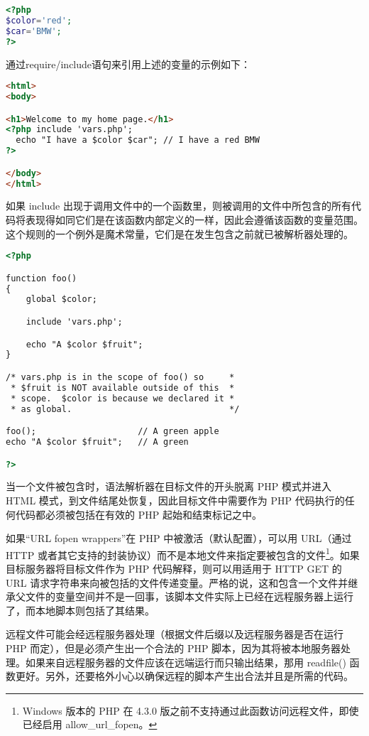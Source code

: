 \begin{lstlisting}[language=PHP]
<?php
$color='red';
$car='BMW';
?>
\end{lstlisting}


通过require/include语句来引用上述的变量的示例如下：


\begin{lstlisting}[language=HTML]
<html>
<body>

<h1>Welcome to my home page.</h1>
<?php include 'vars.php';
  echo "I have a $color $car"; // I have a red BMW
?>

</body>
</html>
\end{lstlisting}

如果 include 出现于调用文件中的一个函数里，则被调用的文件中所包含的所有代码将表现得如同它们是在该函数内部定义的一样，因此会遵循该函数的变量范围。这个规则的一个例外是魔术常量，它们是在发生包含之前就已被解析器处理的。

\begin{lstlisting}[language=HTML]
<?php

function foo()
{
    global $color;

    include 'vars.php';

    echo "A $color $fruit";
}

/* vars.php is in the scope of foo() so     *
 * $fruit is NOT available outside of this  *
 * scope.  $color is because we declared it *
 * as global.                               */

foo();                    // A green apple
echo "A $color $fruit";   // A green

?>
\end{lstlisting}

当一个文件被包含时，语法解析器在目标文件的开头脱离 PHP 模式并进入 HTML 模式，到文件结尾处恢复，因此目标文件中需要作为 PHP 代码执行的任何代码都必须被包括在有效的 PHP 起始和结束标记之中。

如果“URL fopen wrappers”在 PHP 中被激活（默认配置），可以用 URL（通过 HTTP 或者其它支持的封装协议）而不是本地文件来指定要被包含的文件\footnote{Windows 版本的 PHP 在 4.3.0 版之前不支持通过此函数访问远程文件，即使已经启用 allow\_url\_fopen。}。如果目标服务器将目标文件作为 PHP 代码解释，则可以用适用于 HTTP GET 的 URL 请求字符串来向被包括的文件传递变量。严格的说，这和包含一个文件并继承父文件的变量空间并不是一回事，该脚本文件实际上已经在远程服务器上运行了，而本地脚本则包括了其结果。

远程文件可能会经远程服务器处理（根据文件后缀以及远程服务器是否在运行 PHP 而定），但是必须产生出一个合法的 PHP 脚本，因为其将被本地服务器处理。如果来自远程服务器的文件应该在远端运行而只输出结果，那用 readfile() 函数更好。另外，还要格外小心以确保远程的脚本产生出合法并且是所需的代码。


